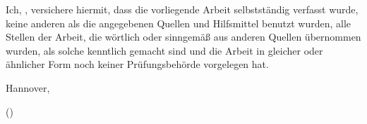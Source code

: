 \newpage
\thispagestyle{empty}

Ich, \Autor, versichere hiermit, dass die vorliegende Arbeit selbstständig verfasst wurde, keine anderen als die angegebenen Quellen und Hilfsmittel benutzt wurden, alle Stellen der Arbeit, die wörtlich oder sinngemäß aus anderen Quellen übernommen wurden, als solche kenntlich gemacht sind und die Arbeit in gleicher oder ähnlicher Form noch keiner Prüfungsbehörde vorgelegen hat.

\vspace{5mm}


\noindent Hannover, \Datum



\vspace{25mm}
(\Autor)


\cleardoublepage